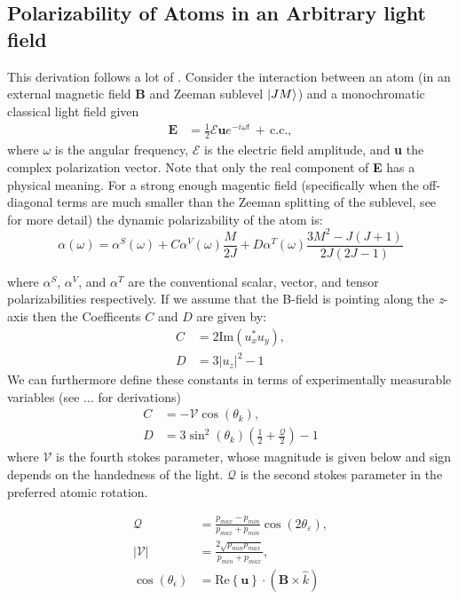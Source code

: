 \documentclass[aps,prl,
,reprint,
superscriptaddress,
onecolumn,
showpacs,preprintnumbers,
 amsmath,amssymb,
]{revtex4-1}
\begin{document}
\subsection{Polarizability of Atoms in an Arbitrary light field}\label{sub_sec_to_polz_deriv}
This derivation follows a lot of \cite{LeKien2013} .
Consider the interaction between an atom (in an external magnetic field \textbf{B} and Zeeman sublevel \(\ket{JM}\)) and a monochromatic classical light field given 
\begin{align}
    \textbf{E} &= \frac{1}{2} \mathcal{E} \textbf{u} e^{-i \omega t} \, + \, \text{c.c.},
\end{align}
where \(\omega\) is the angular frequency, \(\mathcal{E}\) is the electric field amplitude, and \textbf{u} the complex polarization vector. Note that only the real component of \textbf{E} has a physical meaning. For a strong enough magentic field (specifically when the off-diagonal terms are much smaller than the   Zeeman splitting of the sublevel, see \cite{} for more detail) the dynamic polarizability of the atom is:
\begin{equation}
    \alpha(\omega) = \alpha^S(\omega) + C \alpha^V(\omega) \frac{M}{2J} + D \alpha^T(\omega) \frac{3M^2-J(J+1)}{2J(2J-1)}
    \label{eq:polarizability_full}
\end{equation}

where \(\alpha^S\), \(\alpha^V\), and \(\alpha^T\) are the conventional scalar, vector, and tensor polarizabilities respectively. If we assume that the B-field is pointing along the \textit{z}-axis then the Coefficents \(C\) and \(D\) are given by:
\begin{align}
    C &= 2 \text{Im}(u_x^* u_y),\\
    D &= 3|u_z|^2 -1
\end{align}
We can furthermore define these constants in terms of experimentally measurable variables (see ... for derivations)
\begin{align}
     C &= - \mathcal{V} \cos \left( \theta_k \right), \\
     D &= 3 \sin^2\left( \theta_k \right) \left(\frac{1}{2} +  \frac{\mathcal{Q}}{2}\right) -1 
\end{align}
where \(\mathcal{V}\) is the fourth stokes parameter, whose magnitude is given below and sign depends on the handedness of the light. \(\mathcal{Q}\) is the second stokes parameter in the preferred atomic rotation.

\begin{align}
     \mathcal{Q} &=\frac{p_{max}-p_{min}}{p_{max}+p_{min}} \cos(2\theta_\varepsilon), \\
     |\mathcal{V}| &= \frac{2\sqrt{p_{min}p_{max}}}{p_{min}+p_{max}},\\
     \cos(\theta_\epsilon) &=\text{Re}\left\{\textbf{u}\right\}\cdot(\textbf{B}\times \hat{k})
\end{align}
\end{document}
